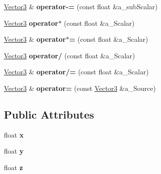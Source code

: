 \begin{DoxyCompactItemize}
\item 
\hypertarget{class_ai_math_1_1_vector3_a6991f11f8903e55fbb7a961f6e00c1a7}{\hyperlink{class_ai_math_1_1_vector3}{Vector3} \& {\bfseries operator-\/=} (const float \&a\+\_\+sub\+Scalar)}\label{class_ai_math_1_1_vector3_a6991f11f8903e55fbb7a961f6e00c1a7}

\item 
\hypertarget{class_ai_math_1_1_vector3_ac8bd24083c4911103c67f792391958fc}{\hyperlink{class_ai_math_1_1_vector3}{Vector3} {\bfseries operator$\ast$} (const float \&a\+\_\+\+Scalar)}\label{class_ai_math_1_1_vector3_ac8bd24083c4911103c67f792391958fc}

\item 
\hypertarget{class_ai_math_1_1_vector3_a3caf6b57598e39b08a1f57c89429384a}{\hyperlink{class_ai_math_1_1_vector3}{Vector3} \& {\bfseries operator$\ast$=} (const float \&a\+\_\+\+Scalar)}\label{class_ai_math_1_1_vector3_a3caf6b57598e39b08a1f57c89429384a}

\item 
\hypertarget{class_ai_math_1_1_vector3_af1c004416bc35813241a5ebee7249ae0}{\hyperlink{class_ai_math_1_1_vector3}{Vector3} {\bfseries operator/} (const float \&a\+\_\+\+Scalar)}\label{class_ai_math_1_1_vector3_af1c004416bc35813241a5ebee7249ae0}

\item 
\hypertarget{class_ai_math_1_1_vector3_aa9eced6f166e20a8a6aef0a482797ae6}{\hyperlink{class_ai_math_1_1_vector3}{Vector3} \& {\bfseries operator/=} (const float \&a\+\_\+\+Scalar)}\label{class_ai_math_1_1_vector3_aa9eced6f166e20a8a6aef0a482797ae6}

\item 
\hypertarget{class_ai_math_1_1_vector3_aa9e4107ecec90e4317bdcccb8966f895}{\hyperlink{class_ai_math_1_1_vector3}{Vector3} \& {\bfseries operator=} (const \hyperlink{class_ai_math_1_1_vector3}{Vector3} \&a\+\_\+\+Source)}\label{class_ai_math_1_1_vector3_aa9e4107ecec90e4317bdcccb8966f895}

\end{DoxyCompactItemize}
\subsection*{Public Attributes}
\begin{DoxyCompactItemize}
\item 
\hypertarget{class_ai_math_1_1_vector3_a8671c13e38e71ded72c70a8aefe06a14}{float {\bfseries x}}\label{class_ai_math_1_1_vector3_a8671c13e38e71ded72c70a8aefe06a14}

\item 
\hypertarget{class_ai_math_1_1_vector3_abd135e44d1c1f1f66f26546141088c9c}{float {\bfseries y}}\label{class_ai_math_1_1_vector3_abd135e44d1c1f1f66f26546141088c9c}

\item 
\hypertarget{class_ai_math_1_1_vector3_ac22ee354f77e2d590a1bbfabfaa34ece}{float {\bfseries z}}\label{class_ai_math_1_1_vector3_ac22ee354f77e2d590a1bbfabfaa34ece}

\end{DoxyCompactItemize}
